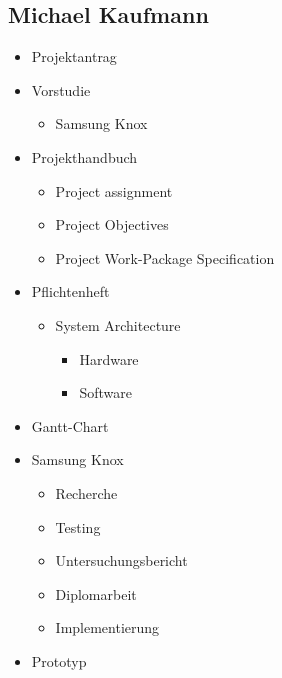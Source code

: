 \newpage

\begin{minipage}[t]{0.47\textwidth}
	\subsection{Michael Kaufmann}
	\begin{itemize}
		\item Projektantrag
		\item Vorstudie
		\begin{itemize}
			\item Samsung Knox
		\end{itemize}
		\item Projekthandbuch
		\begin{itemize}
			\item Project assignment
			\item Project Objectives
			\item Project Work-Package Specification
		\end{itemize}
		\item Pflichtenheft
		\begin{itemize}
			\item System Architecture
			\begin{itemize}
				\item Hardware
				\item Software
			\end{itemize}
		\end{itemize}
		\item Gantt-Chart
		\item Samsung Knox
		\begin{itemize}
			\item Recherche
			\item Testing
			\item Untersuchungsbericht
			\item Diplomarbeit
			\item Implementierung
		\end{itemize}
		\item Prototyp
	\end{itemize}
\end{minipage}%
\hfill
